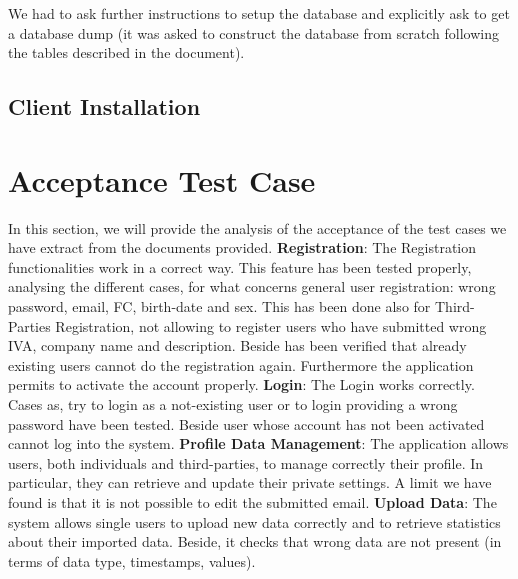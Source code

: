\documentclass[a4paper]{article}
\begin{document}
We had to ask further instructions to setup the database and explicitly ask to get a database dump (it was asked to construct the database from scratch following the tables described in the document).\\

\subsection{Client Installation}

\newpage
\section{Acceptance Test Case}
In this section, we will provide the analysis of the acceptance of the test cases we have extract from the documents provided. \newline\newline
\textbf{Registration}:\newline
The Registration functionalities work in a correct way. This feature has been tested properly, analysing the different cases, for what concerns general user registration: wrong password, email, FC, birth-date and sex. This has been done also for Third-Parties Registration, not allowing to register users who have submitted wrong IVA, company name and description.\newline
Beside has been verified that already existing users cannot do the registration again. Furthermore the application permits to activate the account properly.
\newline\newline
\textbf{Login}:\newline
The Login works correctly. Cases as, try to login as a not-existing user or to login providing a wrong password have been tested. Beside user whose account has not been activated cannot log into the system.
\newline\newline
\textbf{Profile Data Management}:\newline
The application allows users, both individuals and third-parties, to manage correctly their profile. In particular, they can retrieve and update their private settings. A limit we have found is that it is not possible to edit the submitted email.
\newline\newline
\textbf{Upload Data}:\newline
The system allows single users to upload new data correctly and to retrieve statistics about their imported data. Beside, it checks that wrong data  are not present (in terms of data type, timestamps, values).\newline
\end{document}
